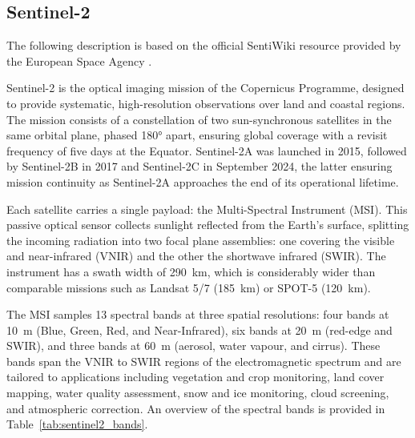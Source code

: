 \subsection{Sentinel-2}
The following description is based on the official SentiWiki resource provided by the European Space Agency \cite{sentiwiki}. 

Sentinel-2 is the optical imaging mission of the Copernicus Programme, designed to provide systematic, high-resolution observations over land and coastal regions. The mission consists of a constellation of two sun-synchronous satellites in the same orbital plane, phased 180° apart, ensuring global coverage with a revisit frequency of five days at the Equator. Sentinel-2A was launched in 2015, followed by Sentinel-2B in 2017 and Sentinel-2C in September 2024, the latter ensuring mission continuity as Sentinel-2A approaches the end of its operational lifetime.  

Each satellite carries a single payload: the Multi-Spectral Instrument (MSI). This passive optical sensor collects sunlight reflected from the Earth’s surface, splitting the incoming radiation into two focal plane assemblies: one covering the visible and near-infrared (VNIR) and the other the shortwave infrared (SWIR). The instrument has a swath width of 290~km, which is considerably wider than comparable missions such as Landsat 5/7 (185~km) or SPOT-5 (120~km).  

The MSI samples 13 spectral bands at three spatial resolutions: four bands at 10~m (Blue, Green, Red, and Near-Infrared), six bands at 20~m (red-edge and SWIR), and three bands at 60~m (aerosol, water vapour, and cirrus). These bands span the VNIR to SWIR regions of the electromagnetic spectrum and are tailored to applications including vegetation and crop monitoring, land cover mapping, water quality assessment, snow and ice monitoring, cloud screening, and atmospheric correction. An overview of the spectral bands is provided in Table~\ref{tab:sentinel2_bands}.  

